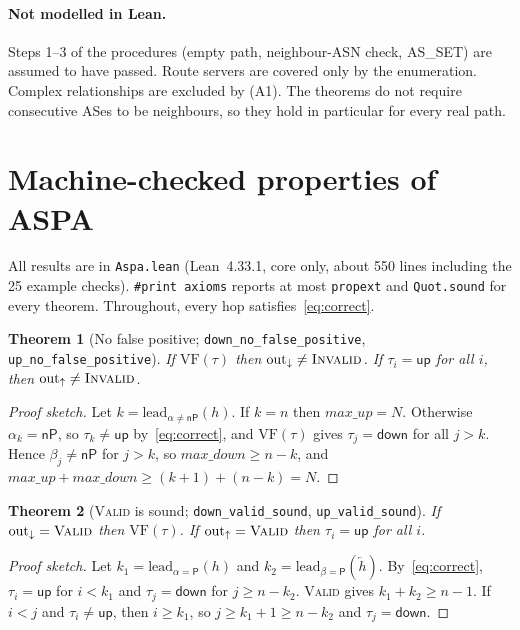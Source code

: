 \documentclass[11pt,a4paper]{article}
\newtheorem{theorem}{Theorem}
\theoremstyle{definition}
\theoremstyle{remark}
\newcommand{\Pp}{\mathsf{P}}      %
\newcommand{\nP}{\mathsf{nP}}     %
\newcommand{\up}{\mathsf{up}}
\newcommand{\down}{\mathsf{down}}
\newcommand{\Valid}{\textup{\textsc{Valid}}}
\newcommand{\Invalid}{\textup{\textsc{Invalid}}}
\newcommand{\maxup}{\mathit{max\_up}}
\newcommand{\maxdown}{\mathit{max\_down}}
\newcommand{\lead}{\mathrm{lead}}
\newcommand{\VF}{\mathrm{VF}}
\newcommand{\lean}[1]{\texttt{#1}}
\begin{document}
\paragraph{Not modelled in Lean.}
Steps 1--3 of the procedures (empty path, neighbour-ASN check, AS\_SET) are assumed to have passed.
Route servers are covered only by the enumeration. Complex relationships are excluded by (A1). The
theorems do not require consecutive ASes to be neighbours, so they hold in particular for every real path.

\section{Machine-checked properties of ASPA}
\label{sec:aspa}

All results are in \lean{Aspa.lean} (Lean~4.33.1, core only, about 550 lines including the 25 example
checks). \lean{\#print axioms} reports at most \lean{propext} and \lean{Quot.sound} for every theorem.
Throughout, every hop satisfies~\eqref{eq:correct}.

\begin{theorem}[No false positive; \lean{down\_no\_false\_positive}, \lean{up\_no\_false\_positive}]
If $\VF(\tau)$ then $\mathrm{out}_{\downarrow}\neq\Invalid$. If $\tau_i=\up$ for all $i$, then
$\mathrm{out}_{\uparrow}\neq\Invalid$.
\end{theorem}
\begin{proof}[Proof sketch]
Let $k=\lead_{\alpha\neq\nP}(h)$. If $k=n$ then $\maxup=N$. Otherwise $\alpha_k=\nP$, so
$\tau_k\neq\up$ by~\eqref{eq:correct}, and $\VF(\tau)$ gives $\tau_j=\down$ for all $j>k$. Hence
$\beta_j\neq\nP$ for $j>k$, so $\maxdown\ge n-k$, and $\maxup+\maxdown\ge (k+1)+(n-k)=N$.
\end{proof}

\begin{theorem}[\Valid{} is sound; \lean{down\_valid\_sound}, \lean{up\_valid\_sound}]
If $\mathrm{out}_{\downarrow}=\Valid$ then $\VF(\tau)$. If $\mathrm{out}_{\uparrow}=\Valid$ then $\tau_i=\up$ for all $i$.
\end{theorem}
\begin{proof}[Proof sketch]
Let $k_1=\lead_{\alpha=\Pp}(h)$ and $k_2=\lead_{\beta=\Pp}(\overleftarrow{h})$. By~\eqref{eq:correct},
$\tau_i=\up$ for $i<k_1$ and $\tau_j=\down$ for $j\ge n-k_2$. \Valid{} gives $k_1+k_2\ge n-1$. If
$i<j$ and $\tau_i\neq\up$, then $i\ge k_1$, so $j\ge k_1+1\ge n-k_2$ and $\tau_j=\down$.
\end{proof}
\end{document}
